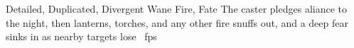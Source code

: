   {Detailed, Duplicated, Divergent}%
  {Wane}%
  {Fire, Fate}%
  {}%
  {The caster pledges aliance to the night, then lanterns, torches, and any other fire snuffs out, and a deep fear sinks in as nearby targets lose \showDam~\glspl{fp}}%
  {}
